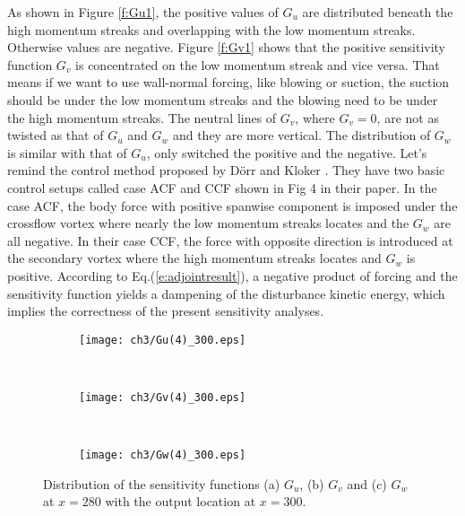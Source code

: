 As shown in Figure \ref{f:Gu1}, the positive values of $G_u$ are distributed beneath the high momentum streaks and overlapping with the low momentum streaks. Otherwise values are negative. Figure \ref{f:Gv1} shows that the positive sensitivity function $G_v$ is concentrated on the low momentum streak and vice versa. That means if we want to use wall-normal forcing, like blowing or suction, the suction should be under the low momentum streaks and the blowing need to be under the high momentum streaks. The neutral lines of $G_v$, where $G_v=0$, are not as twisted as that of $G_u$ and $G_w$ and they are more vertical. The distribution of $G_w$ is similar with that of $G_u$, only switched the positive and the negative. Let's remind the control method proposed by D\"orr and Kloker \cite{dorr2016}. They have two basic control setups called case ACF and CCF shown in Fig 4 in their paper. In the case ACF, the body force with positive spanwise component is imposed under the crossflow vortex where nearly the low momentum streaks locates and the $G_w$ are all negative. In their case CCF, the force with opposite direction is introduced at the secondary vortex where the high momentum streaks locates and $G_w$ is positive. According to Eq.(\ref{e:adjointresult}), a negative product of forcing and the sensitivity function yields a dampening of the disturbance kinetic energy, which implies the correctness of the present sensitivity analyses.
\begin{figure}
  \centering
  \begin{subfigure}{\textwidth}
  \texttt{[image: ch3/Gu(4)\_300.eps]}
  \caption{\label{f:Gu1_300}}
  \end{subfigure}\\
  \bigskip
  \begin{subfigure}{\textwidth}
  \texttt{[image: ch3/Gv(4)\_300.eps]}
  \caption{\label{f:Gv1_300}}
  \end{subfigure}\\
  \bigskip
  \begin{subfigure}{\textwidth}
  \texttt{[image: ch3/Gw(4)\_300.eps]}
  \caption{\label{f:Gw1_300}}
  \end{subfigure}
  \caption{Distribution of the sensitivity functions (a) $G_u$, (b) $G_v$ and (c) $G_w$ at $x =280$ with the output location at $x =300$.}\label{f:Guvw1_300}
\end{figure}


